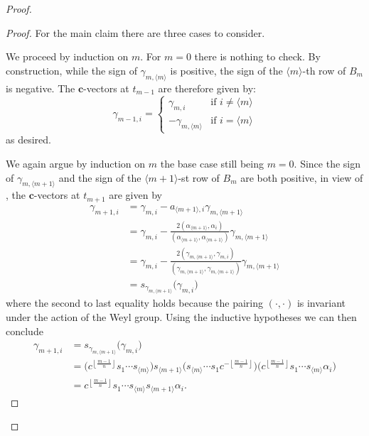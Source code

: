 \documentclass[12pt]{amsart}
\newcommand{\bfc}{\mathbf{c}}
\renewcommand{\mod}[1]{\langle {#1} \rangle}
\theoremstyle{remark}
\numberwithin{equation}{section}
\begin{document}
\begin{proof}
\begin{proof}
  For the main claim there are three cases to consider.

  We proceed by induction on $m$.
  For $m=0$ there is nothing to check.
  By construction, while the sign of $\gamma_{m,\mod{m}}$ is positive, the sign of the $\mod{m}$-th row of $B_m$ is negative. 
  The $\bfc$-vectors at $t_{m-1}$ are therefore given by:
  \begin{equation*}
    \gamma_{m-1,i}
    =
    \begin{cases}
      \gamma_{m,i} & \text{if $i\neq \mod{m}$}\\
      -\gamma_{m,\mod{m}} & \text{if $i = \mod{m}$}
    \end{cases}
  \end{equation*}
  as desired.

  We again argue by induction on $m$ the base case still being $m=0$. 
  Since the sign of $\gamma_{m,\mod{m+1}}$ and the sign of the $\mod{m+1}$-st row of $B_m$ are both positive, in view of \cite[Proposition 1.3]{NZ12}, the $\bfc$-vectors at $t_{m+1}$ are given by
  \begin{align*}
    \gamma_{m+1,i} 
    &= 
    \gamma_{m,i} - a_{\mod{m+1},i} \gamma_{m,\mod{m+1}}\\
    &=
    \gamma_{m,i} - \frac{2(\alpha_{\mod{m+1}},\alpha_i)}{(\alpha_{\mod{m+1}},\alpha_{\mod{m+1}})} \gamma_{m,\mod{m+1}}\\
    &=
    \gamma_{m,i} - \frac{2(\gamma_{m,\mod{m+1}},\gamma_{m,i})}{(\gamma_{m,\mod{m+1}},\gamma_{m,\mod{m+1}})} \gamma_{m,\mod{m+1}}\\
    &=
    s_{\gamma_{m,\mod{m+1}}}\big(\gamma_{m,i}\big)
  \end{align*}
  where the second to last equality holds because the pairing $(\cdot,\cdot)$ is invariant under the action of the Weyl group.  
  Using the inductive hypotheses we can then conclude
  \begin{align*}
    \gamma_{m+1,i} 
    &=
    s_{\gamma_{m,\mod{m+1}}}\big(\gamma_{m,i}\big)\\
    &=
    \big(c^{\left\lfloor\frac{m-1}{n}\right\rfloor}s_1\cdots s_{\mod{m}}\big)s_{\mod{m+1}}\big(s_{\mod{m}}\cdots s_1 c^{-\left\lfloor\frac{m-1}{n}\right\rfloor}\big)\big(c^{\left\lfloor\frac{m-1}{n}\right\rfloor}s_1\cdots s_{\mod{m}}\alpha_i\big)\\
    &= 
    c^{\left\lfloor\frac{m-1}{n}\right\rfloor}s_1\cdots s_{\mod{m}}s_{\mod{m+1}} \alpha_i.
  \end{align*}


\end{proof}
\end{proof}
\end{document}
